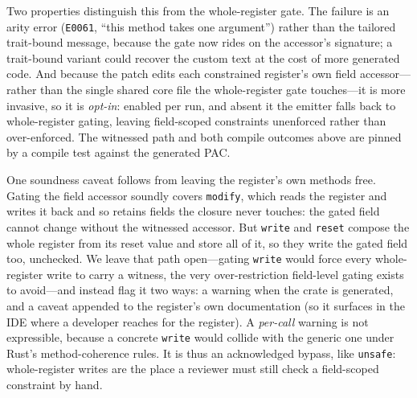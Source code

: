 Two properties distinguish this from the whole-register gate. The failure is
an arity error (\texttt{E0061}, ``this method takes one argument'') rather
than the tailored trait-bound message, because the gate now rides on the
accessor's signature; a trait-bound variant could recover the custom text at
the cost of more generated code. And because the patch edits each
constrained register's own field accessor---rather than the single shared
core file the whole-register gate touches---it is more invasive, so it is
\emph{opt-in}: enabled per run, and absent it the emitter falls back to
whole-register gating, leaving field-scoped constraints unenforced rather
than over-enforced. The witnessed path and both compile outcomes above are
pinned by a compile test against the generated PAC.

One soundness caveat follows from leaving the register's own methods free.
Gating the field accessor soundly covers \texttt{modify}, which reads the
register and writes it back and so retains fields the closure never touches:
the gated field cannot change without the witnessed accessor. But
\texttt{write} and \texttt{reset} compose the whole register from its reset
value and store all of it, so they write the gated field too, unchecked. We
leave that path open---gating \texttt{write} would force every whole-register
write to carry a witness, the very over-restriction field-level gating
exists to avoid---and instead flag it two ways: a warning when the crate is generated, and a
caveat appended to the register's own documentation (so it surfaces in the
IDE where a developer reaches for the register). A \emph{per-call} warning is
not expressible, because a concrete \texttt{write} would collide with the
generic one under Rust's method-coherence rules. It is thus an acknowledged
bypass, like \texttt{unsafe}: whole-register writes are the place a reviewer
must still check a field-scoped constraint by hand.

